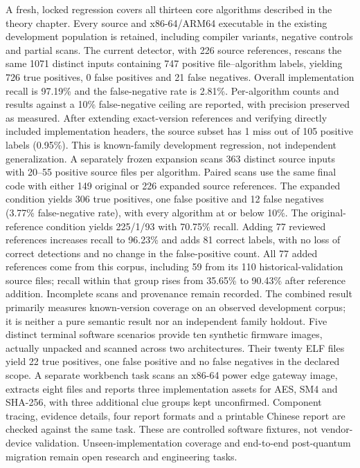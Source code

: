 \documentclass[UTF8,a4paper,11pt,titlepage,oneside]{ctexbook}
\begin{document}
A fresh, locked regression covers all thirteen core algorithms described in the
theory chapter. Every source and x86-64/ARM64 executable in the existing development
population is retained, including compiler variants, negative controls and partial scans.
The current detector, with 226 source references, rescans the same 1071 distinct
inputs containing 747 positive file--algorithm labels,
yielding 726 true positives, 0 false positives and 21 false negatives.
Overall implementation recall is 97.19\% and the false-negative rate is 2.81\%.
Per-algorithm counts and results against a 10\% false-negative ceiling are reported,
with precision preserved as measured. After extending exact-version references
and verifying directly included implementation headers, the source subset has
1 miss out of 105 positive labels (0.95\%). This is known-family development regression,
not independent generalization.
A separately frozen expansion scans 363 distinct source inputs with 20--55 positive
source files per algorithm. Paired scans use the same final code with either 149 original
or 226 expanded source references. The expanded condition yields 306 true positives, one false positive and 12 false
negatives (3.77\% false-negative rate), with every algorithm at or below 10\%.
The original-reference condition yields 225/1/93 with 70.75\% recall.
Adding 77 reviewed references increases recall to 96.23\% and adds 81 correct labels,
with no loss of correct detections and no change in the false-positive count.
All 77 added references come from this corpus, including 59 from its 110 historical-validation
source files; recall within that group rises from 35.65\% to 90.43\% after reference addition.
Incomplete scans and provenance remain recorded. The combined result primarily
measures known-version coverage on an observed development corpus; it is neither
a pure semantic result nor an independent family holdout.
Five distinct terminal software scenarios provide ten
synthetic firmware images, actually unpacked and scanned across two architectures.
Their twenty ELF files yield 22 true positives, one false positive and no false
negatives in the declared scope. A separate workbench task scans an x86-64 power edge
gateway image, extracts eight files and reports three implementation assets for AES,
SM4 and SHA-256, with three additional clue groups kept unconfirmed. Component tracing,
evidence details, four report formats and a printable Chinese report are checked against
the same task. These are controlled software fixtures, not vendor-device validation.
Unseen-implementation coverage and end-to-end post-quantum
migration remain open research and engineering tasks.
\mainmatter
\end{document}

